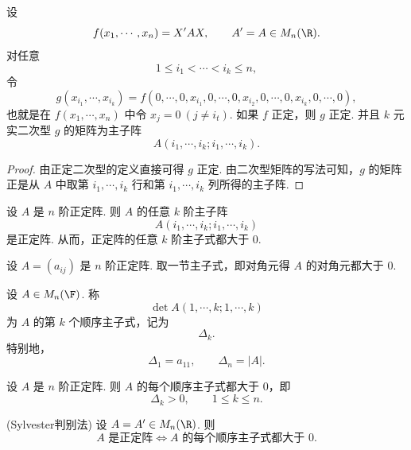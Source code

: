 \begin{lemma}
	设
	\[
	f(x_1,\cdots,x_n)=X'AX,
	\qquad A'=A\in M_n(\R).
	\]
	对任意
	\[
	1\leq i_1<\cdots<i_k\leq n,
	\]
	令
	\[
	g(x_{i_1},\cdots,x_{i_k})
	=f(0,\cdots,0,x_{i_1},0,\cdots,0,x_{i_2},0,\cdots,0,x_{i_k},0,\cdots,0),
	\]
	也就是在 $f(x_1,\cdots,x_n)$ 中令 $x_j=0\ (j\ne i_t)$. 如果 $f$ 正定，则 $g$ 正定.
	并且 $k$ 元实二次型 $g$ 的矩阵为主子阵
	\[
	A(i_1,\cdots,i_k;i_1,\cdots,i_k).
	\]
\end{lemma}

\begin{proof}
	由正定二次型的定义直接可得 $g$ 正定. 由二次型矩阵的写法可知，$g$ 的矩阵正是从 $A$ 中取第 $i_1,\cdots,i_k$ 行和第 $i_1,\cdots,i_k$ 列所得的主子阵.
\end{proof}
\begin{corollary}
	设 $A$ 是 $n$ 阶正定阵. 则 $A$ 的任意 $k$ 阶主子阵
	\[
	A(i_1,\cdots,i_k;i_1,\cdots,i_k)
	\]
	是正定阵. 从而，正定阵的任意 $k$ 阶主子式都大于 $0$.
\end{corollary}




	设 $A=(a_{ij})$ 是 $n$ 阶正定阵. 取一节主子式，即对角元得 $A$ 的对角元都大于 $0$.


\begin{definition}
	设 $A\in M_n(\F)$. 称
	\[
	\det A(1,\cdots,k;1,\cdots,k)
	\]
	为 $A$ 的第 $k$ 个顺序主子式，记为
	\[
	\Delta_k.
	\]
	特别地，
	\[
	\Delta_1=a_{11},\qquad \Delta_n=|A|.
	\]
\end{definition}

	设 $A$ 是 $n$ 阶正定阵. 则 $A$ 的每个顺序主子式都大于 $0$，即
	\[
	\Delta_k>0,\qquad 1\leq k\leq n.
	\]
\begin{theorem}(Sylvester判别法)
	设 $A=A'\in M_n(\R)$. 则
	\[
	A\text{ 是正定阵}\Longleftrightarrow A\text{ 的每个顺序主子式都大于 }0.
	\]
\end{theorem}

